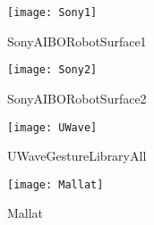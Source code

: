 \documentclass[../../thesis.tex]{subfiles}
\begin{document}
\begin{figure}[h]
        \vspace{0.4cm}
        
        \begin{minipage}[b]{0.32\textwidth}
            \centering
            \texttt{[image: Sony1]}
            \caption*{SonyAIBORobotSurface1}
        \end{minipage}
        \hfill
        \begin{minipage}[b]{0.32\textwidth}
            \centering
            \texttt{[image: Sony2]}
            \caption*{SonyAIBORobotSurface2}
        \end{minipage}
        \hfill
        \begin{minipage}[b]{0.32\textwidth}
            \centering
            \texttt{[image: UWave]}
            \caption*{UWaveGestureLibraryAll}
        \end{minipage}
        
        \vspace{0.4cm}
        
        \begin{minipage}[b]{0.32\textwidth}
            \centering
            \texttt{[image: Mallat]}
            \caption*{Mallat}
        \end{minipage}
        
    \end{figure}
\end{document}

